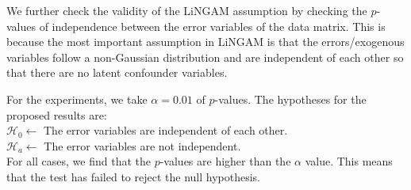 \documentclass{article}
\begin{document}
We further check the validity of the LiNGAM assumption by checking the $p$-values of independence between the error variables of the data matrix. This is because the most important assumption in LiNGAM is that the errors/exogenous variables follow a non-Gaussian distribution and are independent of each other so that there are no latent confounder variables. 

For the experiments, we take $\alpha = 0.01$ of $p$-values. The hypotheses for the proposed results are:\\
$\mathcal{H}_0 \leftarrow$ The error variables are independent of each other.\\
$\mathcal{H}_a \leftarrow$ The error variables are not independent.\\
For all cases, we find that the $p$-values are higher than the $\alpha$ value. This means that the test has failed to reject the null hypothesis.
\end{document}
